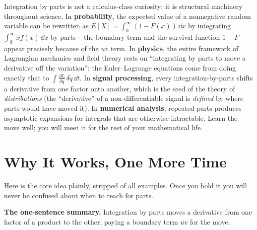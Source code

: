 \begin{applicationbox}
Integration by parts is not a calculus-class curiosity; it is structural
machinery throughout science. In \textbf{probability}, the expected value of a
nonnegative random variable can be rewritten as
$E[X] = \int_0^\infty (1-F(x))\,\dd x$ by integrating $\int_0^\infty x f(x)\,\dd x$
by parts -- the boundary term and the survival function $1-F$ appear precisely
because of the $uv$ term. In \textbf{physics}, the entire framework of Lagrangian
mechanics and field theory rests on ``integrating by parts to move a derivative
off the variation'': the Euler--Lagrange equations come from doing exactly that to
$\int \frac{\partial L}{\partial \dot q}\,\delta\dot q\,\dd t$. In \textbf{signal
processing}, every integration-by-parts shifts a derivative from one factor onto
another, which is the seed of the theory of \emph{distributions} (the
``derivative'' of a non-differentiable signal is \emph{defined} by where parts
would have moved it). In \textbf{numerical analysis}, repeated parts produces
asymptotic expansions for integrals that are otherwise intractable. Learn the move
well; you will meet it for the rest of your mathematical life.
\end{applicationbox}

\section{Why It Works, One More Time}
\label{ch23:whyworks}

Here is the core idea plainly, stripped of all examples. Once you hold it you
will never be confused about when to reach for parts.

\begin{intuitionbox}
\textbf{The one-sentence summary.} Integration by parts moves a derivative from
one factor of a product to the other, paying a boundary term $uv$ for the move.
\end{intuitionbox}

